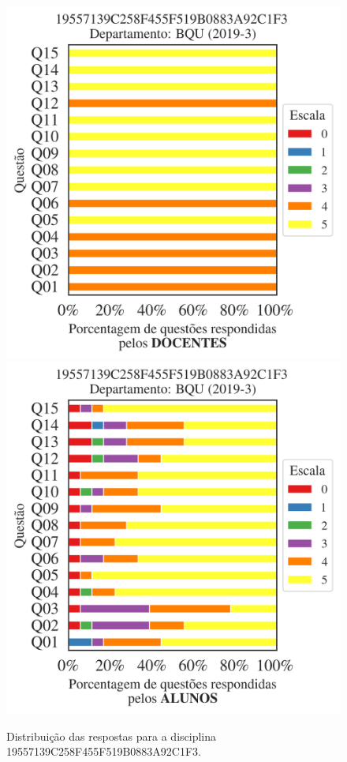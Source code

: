 \documentclass[a4paper,10pt]{article}
\begin{document}
\begin{figure}[h]
\centering
\includegraphics[width=0.485\linewidth]{analise_disciplina_departamento_BQU_19557139C258F455F519B0883A92C1F3_docentes.png}
\includegraphics[width=0.485\linewidth]{analise_disciplina_departamento_BQU_19557139C258F455F519B0883A92C1F3_alunos.png}
\caption{\label{fig:analise_geral_departamento}                Distribuição das respostas para a disciplina 19557139C258F455F519B0883A92C1F3. }
\end{figure}
\end{document}
